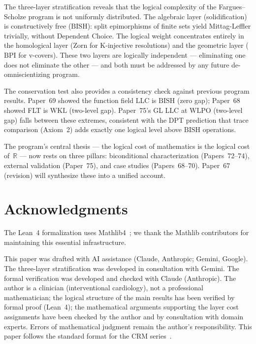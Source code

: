 \documentclass[12pt, a4paper]{article}
\theoremstyle{plain}
\theoremstyle{definition}
\theoremstyle{remark}
\newcommand{\BISH}{\mathrm{BISH}}
\newcommand{\WKL}{\mathrm{WKL}}
\newcommand{\WLPO}{\mathrm{WLPO}}
\newcommand{\BPI}{\mathrm{BPI}}
\begin{document}
The three-layer stratification reveals that the logical complexity
of the Fargues--Scholze program is not uniformly distributed.
The algebraic layer (solidification) is constructively free
($\BISH$): split epimorphisms of finite sets yield
Mittag-Leffler trivially, without Dependent Choice.  The
logical weight concentrates entirely in the homological layer
(Zorn for K-injective resolutions) and the geometric layer
($\BPI$ for v-covers).  These two layers are logically
independent --- eliminating one does not eliminate the other ---
and both must be addressed by any future de-omniscientizing
program.

The conservation test also provides a consistency check against
previous program results.  Paper~69 showed the function field LLC
is $\BISH$ (zero gap); Paper~68 showed FLT is $\WKL$ (two-level
gap).  Paper~75's GL LLC at $\WLPO$ (two-level gap) falls between
these extremes, consistent with the DPT prediction that trace
comparison (Axiom~2) adds exactly one logical level above $\BISH$
operations.

The program's central thesis --- the logical cost of mathematics
is the logical cost of~$\mathbb{R}$ --- now rests on three pillars:
biconditional characterization (Papers~72--74), external validation
(Paper~75), and case studies (Papers~68--70).  Paper~67 (revision)
will synthesize these into a unified account.


\section*{Acknowledgments}

The Lean~4 formalization uses Mathlib4~\cite{mathlib}; we thank the
Mathlib contributors for maintaining this essential infrastructure.

This paper was drafted with AI assistance (Claude, Anthropic; Gemini,
Google).  The three-layer stratification was developed in consultation
with Gemini.  The formal verification was developed and checked with
Claude (Anthropic).  The author is a clinician (interventional
cardiology), not a professional mathematician; the logical structure
of the main results has been verified by formal proof (Lean~4); the
mathematical arguments supporting the layer cost assignments have been
checked by the author and by consultation with domain experts.
Errors of mathematical judgment remain the author's responsibility.
This paper follows the standard format for the CRM
series~\cite{format-guide}.
\end{document}

